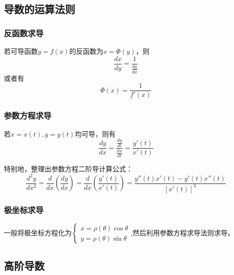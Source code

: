\documentclass[12pt , a4paper , oneside]{ctexart}
\begin{document}
        \subsection{导数的运算法则}
            \subsubsection{反函数求导}
            若可导函数$y=f(x)$的反函数为$x=\Phi (y)$，则
            $$\frac{dx}{dy} = \frac{1}{\frac{dy}{dx}}$$或者有
            $$ \Phi (x) = \frac{1}{f' (x)} $$

            \subsubsection{参数方程求导}
            若$x=x(t),y=y(t)$均可导，则有
            $$\frac{dy}{dx} = \frac{\frac{dy}{dt}}{\frac{dx}{dt}} = \frac{y'(t)}{x'(t)}$$

            特别地，整理出参数方程二阶导计算公式：
            $$\frac{d^2y}{dx^2} = \frac{d}{dx}(\frac{dy}{dx}) = \frac{d}{dx}(\frac{y'(t)}{x'(t)}) = \frac{y''(t)x'(t) - y'(t)x''(t)}{[x'(t)]^3}$$

            \subsubsection{极坐标求导}
            一般将极坐标方程化为$\begin{cases}
                x = \rho(\theta) \cos \theta\\
                y = \rho(\theta) \sin \theta
            \end{cases}$,然后利用参数方程求导法则求导。
        \subsection{高阶导数}
\end{document}

